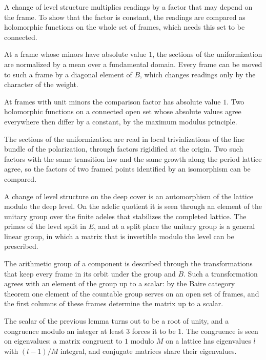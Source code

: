 A change of level structure multiplies readings by a factor that may depend on the frame. To show that
the factor is constant, the readings are compared as holomorphic functions on the whole set of frames,
which needs this set to be connected.

At a frame whose minors have absolute value $1$, the sections of the uniformization are normalized by a
mean over a fundamental domain. Every frame can be moved to such a frame by a diagonal element of $B$,
which changes readings only by the character of the weight.

At frames with unit minors the comparison factor has absolute value $1$. Two holomorphic functions
on a connected open set whose absolute values agree everywhere then differ by a constant, by the maximum
modulus principle.

The sections of the uniformization are read in local trivializations of the line bundle of the
polarization, through factors rigidified at the origin. Two such factors with the same transition law
and the same growth along the period lattice agree, so the factors of two framed points identified by
an isomorphism can be compared.

A change of level structure on the deep cover is an automorphism of the lattice modulo the deep level. On
the adelic quotient it is seen through an element of the unitary group over the finite adeles that
stabilizes the completed lattice. The primes of the level split in $E$, and at a split place the unitary
group is a general linear group, in which a matrix that is invertible modulo the level can be prescribed.

The arithmetic group of a component is described through the transformations that keep every frame in
its orbit under the group and $B$. Such a transformation agrees with an element of the group up to a
scalar: by the Baire category theorem one element of the countable group serves on an open set of frames,
and the first columns of these frames determine the matrix up to a scalar.

The scalar of the previous lemma turns out to be a root of unity, and a congruence modulo an integer at
least $3$ forces it to be $1$. The congruence is seen on eigenvalues: a matrix congruent to $1$ modulo $M$
on a lattice has eigenvalues $l$ with $(l-1)/M$ integral, and conjugate matrices share their eigenvalues.

